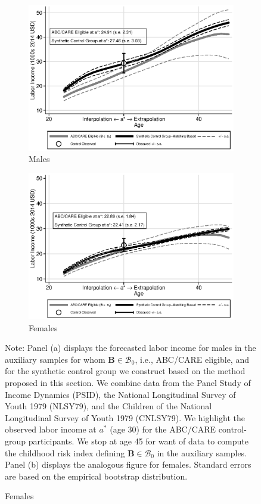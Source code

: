\begin{figure}
\centering
\caption{Labor Income Profile, Disadvantaged Individuals Synthetic Control Group in the Auxiliary Samples}\label{figure:controltests}
\begin{subfigure}[h]{0.5\textwidth}
		\centering
		\caption{Males}
		\includegraphics[width=\textwidth]{output/abccare_disad_1.eps}
\end{subfigure}%
\begin{subfigure}[h]{0.5\textwidth}
		\centering
		\caption{Females}
		\includegraphics[width=\textwidth]{output/abccare_disad_0.eps}
\end{subfigure}
\footnotesize \justify
Note: Panel (a) displays the forecasted labor income for males in the auxiliary samples for whom $\bm{B} \in \mathcal{B}_0$, i.e., ABC/CARE eligible, and for the synthetic control group we construct based on the method proposed in this section. We combine data from the Panel Study of Income Dynamics (PSID), the National Longitudinal Survey of Youth 1979 (NLSY79), and the Children of the National Longitudinal Survey of Youth 1979 (CNLSY79). We highlight the observed labor income at $a^*$ (age 30) for the ABC/CARE control-group participants. We stop at age 45 for want of data to compute the childhood risk index defining $\bm{B} \in \mathcal{B}_0$ in the auxiliary samples. Panel (b) displays the analogous figure for females. Standard errors are based on the empirical bootstrap distribution.
\end{figure}

